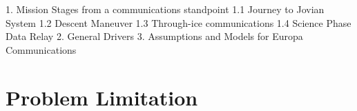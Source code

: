 %



1. Mission Stages from a communications standpoint
    1.1 Journey to Jovian System
    1.2 Descent Maneuver
    1.3 Through-ice communications
    1.4 Science Phase Data Relay
2. General Drivers
3. Assumptions and Models for Europa Communications

\section{Problem Limitation}
